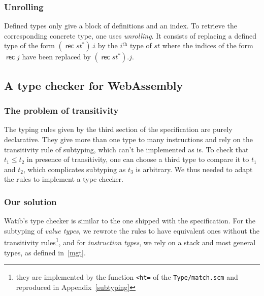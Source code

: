 \documentclass[a4paper,11pt]{article}
\DeclareMathOperator{\rect}{\textsf{rec}}
\begin{document}
\subsubsection{Unrolling}
Defined types only give a block of definitions and an index. To retrieve the
corresponding concrete type, one uses \emph{unrolling}. It consists of replacing
a defined type of the form $(\rect st^*).i$ by the $i^{\text{th}}$ type of $st$
where the indices of the form $\rect j$ have been replaced by $(\rect st^*).j$.

\subsection{A type checker for WebAssembly}\label{algo}
\subsubsection{The problem of transitivity}
The typing rules given by the third section of the specification are purely
declarative. They give more than one type to many instructions and rely on the
transitivity rule of subtyping, which can't be implemented as is. To check that
$t_1 \leq t_2$ in presence of transitivity, one can choose a third type to
compare it to $t_1$ and $t_2$, which complicates subtyping as $t_3$ is
arbitrary. We thus needed to adapt the rules to implement a type checker.

\subsubsection{Our solution}
\textsf{Watib}'s type checker is similar to the one shipped with the
specification. For the subtyping of \emph{value types}, we rewrote the rules to
have equivalent ones without the transitivity rules\footnote{they are
implemented by the function \texttt{<ht=} of the \texttt{Type/match.scm} and
reproduced in Appendix~\ref{subtyping}}, and for \emph{instruction types}, we
rely on a stack and most general types, as defined in~\ref{mgt}.
\end{document}
